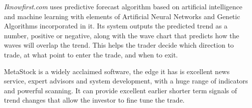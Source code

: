 \cite{iknow} \textit{Iknowfirst.com} uses predictive forecast algorithm based on artificial intelligence and machine learning with elements of Artificial Neural Networks and Genetic Algorithms incorporated in it. Its system outputs the predicted trend as a number, positive or negative, along with the wave chart that predicts how the waves will overlap the trend. This helps the trader decide which direction to trade, at what point to enter the trade, and when to exit.

\cite{itt} MetaStock is a widely acclaimed software, the edge it has is excellent news service, expert advisors and system development, with a huge range of indicators and powerful scanning. It can provide excellent earlier shorter term signals of trend changes that allow the investor to fine tune the trade. 

